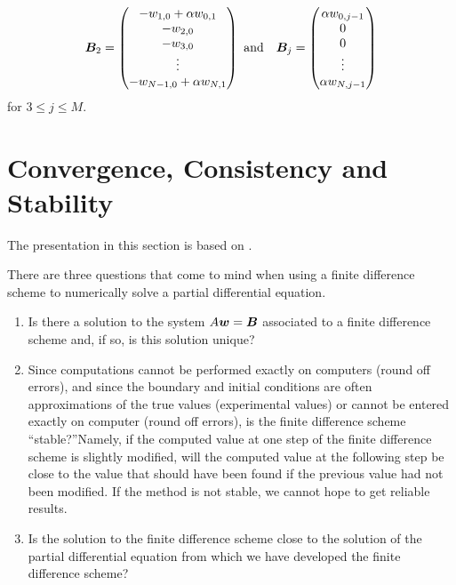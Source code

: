 \[
\bm{B}_2 = \begin{pmatrix}
-w_{1,0} + \alpha w_{0,1}\\
-w_{2,0} \\
-w_{3,0} \\
\vdots \\
-w_{N-1,0} + \alpha w_{N,1} \\
\end{pmatrix}
\ \text{and} \quad
\bm{B}_j = \begin{pmatrix}
\alpha w_{0,j-1}\\
0\\
0\\
\vdots \\
\alpha w_{N,j-1}
\end{pmatrix}
\]
for $3 \leq j \leq M$.

\section{Convergence, Consistency and Stability} \label{fdm_CCS}

The presentation in this section is based on \cite{IK,WH,I}.

There are three questions that come to mind when using a finite
difference scheme to numerically solve a partial differential equation.

\begin{enumerate}
\item Is there a solution to the system $A\bm{w} = \bm{B}$
  associated to a finite difference scheme and, if so, is this
  solution unique?
\item Since computations cannot be performed exactly on computers
  (round off errors), and since the boundary and initial conditions
  are often approximations of the true values (experimental values) or
  cannot be entered exactly on computer (round off errors), is the
  finite difference scheme ``stable?''\quad  Namely, if the computed
  value at one step of the finite difference scheme is slightly modified,
  will the computed value at the following step be close to the value
  that should have been found if the previous value had not been
  modified.  If the method is not stable, we cannot hope to get
  reliable results.
\item Is the solution to the finite difference scheme close to the
  solution of the partial differential equation from which we have
  developed the finite difference scheme?
\end{enumerate}

